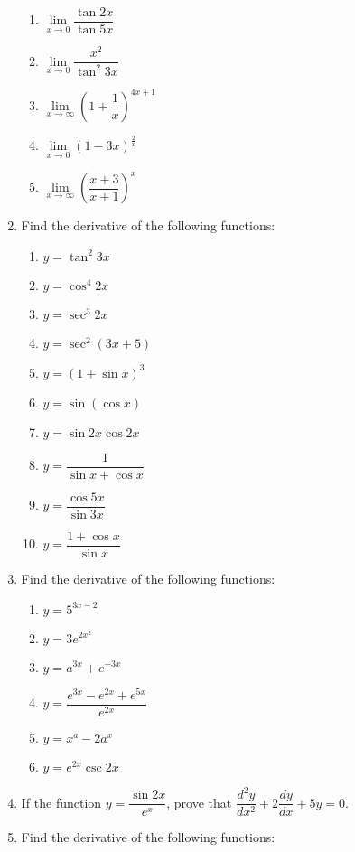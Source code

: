 \documentclass[12pt]{report}
\begin{document}
\begin{enumerate}
\begin{enumerate}
              \item $\lim\limits_{x\to0}{\dfrac{\tan2x}{\tan5x}}$
              \item $\lim\limits_{x\to0}\dfrac{x^{2}}{\tan^{2}3x}$
              \item $\lim\limits_{x\to\infty}{\left(1+{\dfrac{1}{x}}\right)}^{4x+1}$
              \item $\lim\limits_{x\to0}{\left(1-3x\right)}^{\frac{2}{x}}$
              \item $\lim\limits_{x\to\infty}{\left({\dfrac{x+3}{x+1}}\right)}^{x}$
          \end{enumerate}
    \item Find the derivative of the following functions:
          \begin{enumerate}
              \item $y=\tan^{2}3x$
              \item $y=\cos^{4}2x$
              \item $y=\sec^{3}2x$
              \item $y=\sec^{2}(3x+5)$
              \item $y={(1+\sin x)}^{3}$
              \item $y=\sin\left(\cos x\right)$
              \item $y=\sin2x\cos2x$
              \item $y={\dfrac{1}{\sin x+\cos x}}$
              \item $y={\dfrac{\cos 5x}{\sin 3x}}$
              \item $y={\dfrac{1+\cos x}{\sin x}}$
          \end{enumerate}
    \item Find the derivative of the following functions:
          \begin{enumerate}
              \item $y=5^{3x-2}$
              \item $y=3e^{2x^{2}}$
              \item $y=a^{3x}+e^{-3x}$
              \item $y={\dfrac{e^{3x}-e^{2x}+e^{5x}}{e^{2x}}}$
              \item $y=x^{a}-2a^{x}$
              \item $y=e^{2x}\csc2x$
          \end{enumerate}
    \item If the function $y = \dfrac{\sin 2x}{e^x}$, prove that $\dfrac{d^2y}{dx^2} +
              2\dfrac{dy}{dx} + 5y = 0$.
    \item Find the derivative of the following functions:

\end{enumerate}
\end{document}
